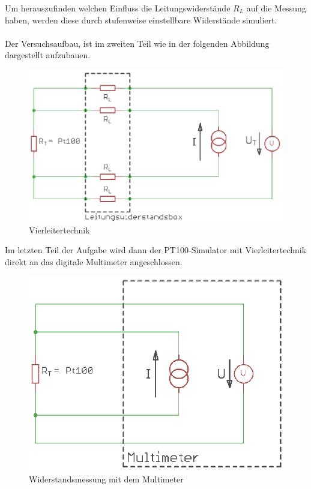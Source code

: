 \documentclass[a4paper,11pt,oneside]{article}
\begin{document}
Um herauszufinden welchen Einfluss die Leitungswiderstände $R_L$ auf die Messung haben, werden diese durch stufenweise einstellbare Widerstände simuliert. \\\\
Der Versuchsaufbau, ist im zweiten Teil wie in der folgenden Abbildung dargestellt aufzubauen.
\vspace{1cm}
\begin{figure}[h]
\centering
\includegraphics[scale=0.5]{Bilder/4Leitertechnik.png}
\caption{Vierleitertechnik}
\end{figure}
Im letzten Teil der Aufgabe wird dann der PT100-Simulator mit Vierleitertechnik direkt an das digitale Multimeter angeschlossen.\\
\begin{figure}[h]
\centering
\includegraphics[scale=0.5]{Bilder/4LTDIMM.png}
\caption{Widerstandsmessung mit dem Multimeter}
\end{figure}
\end{document}

